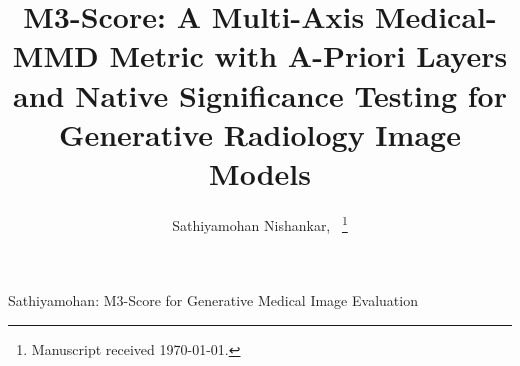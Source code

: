 \documentclass[lettersize,journal]{IEEEtran}
\begin{document}

\title{M3-Score: A Multi-Axis Medical-MMD Metric with A-Priori Layers
       and Native Significance Testing for Generative Radiology Image Models}

\author{Sathiyamohan Nishankar,~
  \thanks{Manuscript received \today.}}

%
         {Sathiyamohan: M3-Score for Generative Medical Image Evaluation}

\maketitle
\end{document}
